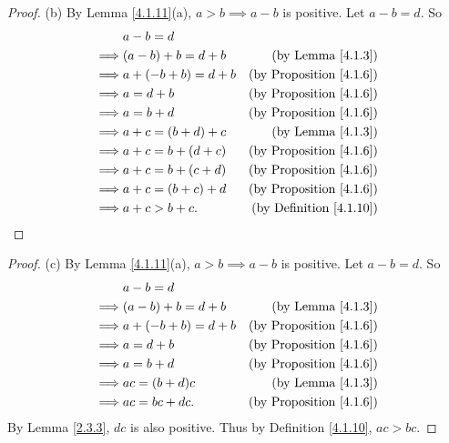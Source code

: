 \begin{proof}{(b)}
By Lemma \ref{4.1.11}(a), \(a > b \implies a - b\) is positive.
Let \(a - b = d\).
So
\begin{align*}
& a - b = d \\
\implies & (a - b) + b = d + b & \text{(by Lemma \ref{4.1.3})} \\
\implies & a + (-b + b) = d + b & \text{(by Proposition \ref{4.1.6})} \\
\implies & a = d + b & \text{(by Proposition \ref{4.1.6})} \\
\implies & a = b + d & \text{(by Proposition \ref{4.1.6})} \\
\implies & a + c = (b + d) + c & \text{(by Lemma \ref{4.1.3})} \\
\implies & a + c = b + (d + c) & \text{(by Proposition \ref{4.1.6})} \\
\implies & a + c = b + (c + d) & \text{(by Proposition \ref{4.1.6})} \\
\implies & a + c = (b + c) + d & \text{(by Proposition \ref{4.1.6})} \\
\implies & a + c > b + c. & \text{(by Definition \ref{4.1.10})} \\
\end{align*}
\end{proof}

\begin{proof}{(c)}
By Lemma \ref{4.1.11}(a), \(a > b \implies a - b\) is positive.
Let \(a - b = d\).
So
\begin{align*}
& a - b = d \\
\implies & (a - b) + b = d + b & \text{(by Lemma \ref{4.1.3})} \\
\implies & a + (-b + b) = d + b & \text{(by Proposition \ref{4.1.6})} \\
\implies & a = d + b & \text{(by Proposition \ref{4.1.6})} \\
\implies & a = b + d & \text{(by Proposition \ref{4.1.6})} \\
\implies & ac = (b + d)c & \text{(by Lemma \ref{4.1.3})} \\
\implies & ac = bc + dc. & \text{(by Proposition \ref{4.1.6})}
\end{align*}
By Lemma \ref{2.3.3}, \(dc\) is also positive.
Thus by Definition \ref{4.1.10}, \(ac > bc\).
\end{proof}

